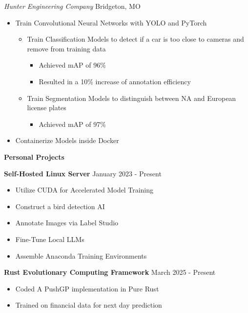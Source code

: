 \documentclass[11pt]{article}
\begin{document}
\textsl{Hunter Engineering Company} \hfill Bridgeton, MO
\begin{itemize}[noitemsep, topsep=0pt, partopsep=0pt, parsep=0pt, itemsep=0pt]
    \item Train Convolutional Neural Networks with YOLO and PyTorch
    \begin{itemize}[noitemsep, topsep=0pt, partopsep=0pt, parsep=0pt, itemsep=0pt]
        \item Train Classification Models to detect if a car is too close to cameras and remove from training data
        \begin{itemize}[noitemsep, topsep=0pt, partopsep=0pt, parsep=0pt, itemsep=0pt]
            \item Achieved mAP of 96\%
            \item Resulted in a 10\% increase of annotation efficiency
        \end{itemize}
        \item Train Segmentation Models to distinguish between NA and European license plates
        \begin{itemize}[noitemsep, topsep=0pt, partopsep=0pt, parsep=0pt, itemsep=0pt]
            \item Achieved mAP of 97\%
        \end{itemize}
    \end{itemize}
    \item Containerize Models inside Docker
\end{itemize}


\begin{center}
    \textbf{Personal Projects}
\end{center}

\textbf{Self-Hosted Linux Server} \hfill January 2023 - Present
\begin{itemize}[noitemsep, topsep=0pt, partopsep=0pt, parsep=0pt, itemsep=0pt]
    \item Utilize CUDA for Accelerated Model Training
    \item Construct a bird detection AI
    \item Annotate Images via Label Studio
    \item Fine-Tune Local LLMs
    \item Assemble Anaconda Training Environments
\end{itemize}

\textbf{Rust Evolutionary Computing Framework} \hfill March 2025 - Present
\begin{itemize}[noitemsep, topsep=0pt, partopsep=0pt, parsep=0pt, itemsep=0pt]
    \item Coded A PushGP implementation in Pure Rust
    \item Trained on financial data for next day prediction
\end{itemize}
\end{document}
